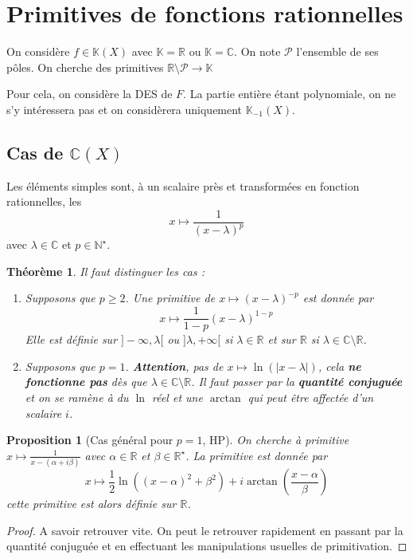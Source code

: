 \documentclass[french]{book}
\newcommand{\N}{\mathbb{N}}
\newcommand{\R}{\mathbb{R}}
\newcommand{\C}{\mathbb{C}}
\newcommand{\K}{\mathbb{K}}
\newcommand{\st}{^\star}
\theoremstyle{plain}
\newtheorem{thm}{Théorème}[chapter]
\newtheorem{prop}{Proposition}[chapter]
\theoremstyle{definition}
\theoremstyle{remark}
\begin{document}
\section{Primitives de fonctions rationnelles}
On considère $f\in\K(X)$ avec $\K=\R$ ou $\K=\C$. On note $\mathcal{P}$ l'ensemble de ses pôles. On cherche des primitives $\R\setminus\mathcal{P}\rightarrow\K$ \par Pour cela, on considère la DES de $F$. La partie entière étant polynomiale, on ne s'y intéressera pas et on considèrera uniquement $\K_{-1}(X)$.
\subsection{Cas de $\C(X)$}
Les éléments simples sont, à un scalaire près et transformées en fonction rationnelles, les $$x\mapsto \frac{1}{(x-\lambda)^p}$$ avec $\lambda\in\C$ et $p\in\N\st$.
\begin{thm}
	Il faut distinguer les cas :
	\begin{enumerate}
		\item Supposons que $p\geqslant2$. Une primitive de $x\mapsto (x-\lambda)^{-p}$ est donnée par $$x\mapsto \frac{1}{1-p}(x-\lambda)^{1-p}$$ Elle est définie sur $]-\infty,\lambda[$ ou $]\lambda,+\infty[$ si $\lambda\in\R$ et sur $\R$ si $\lambda\in\C\setminus\R$.
		\item Supposons que $p=1$. \textbf{Attention}, pas de $x\mapsto\ln(\lvert x-\lambda\rvert)$, cela \textbf{ne fonctionne pas} dès que $\lambda\in\C\setminus\R$. Il faut passer par la \textbf{quantité conjuguée} et on se ramène à du $\ln$ réel et une $\arctan$ qui peut être affectée d'un scalaire $i$.
	\end{enumerate}
\end{thm}
\begin{prop}[Cas général pour $p=1$, HP]
	On cherche à primitive $\displaystyle x\mapsto\frac{1}{x-(\alpha+i\beta)}$ avec $\alpha\in\R$ et $\beta\in\R\st$. La primitive est donnée par $$x\mapsto \frac{1}{2}\ln\left((x-\alpha)^2+\beta^2\right)+i\arctan\left(\frac{x-\alpha}{\beta}\right)$$ cette primitive est alors définie sur $\R$.
\end{prop}
\begin{proof}
	A savoir retrouver vite. On peut le retrouver rapidement en passant par la quantité conjuguée et en effectuant les manipulations usuelles de primitivation.
\end{proof}
\end{document}
